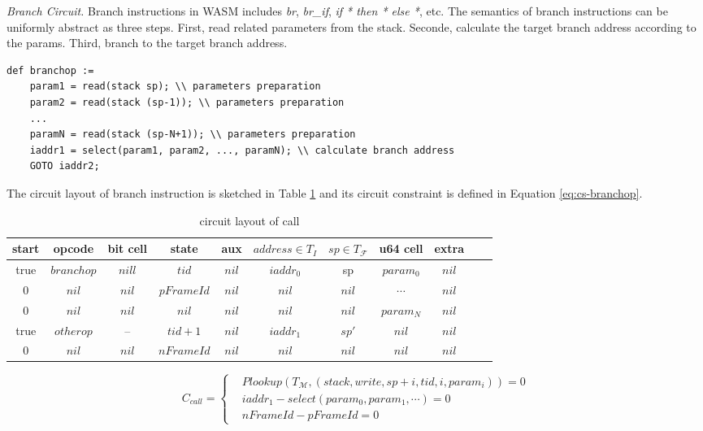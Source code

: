 \smallskip\noindent\emph{Branch Circuit.}
Branch instructions in WASM includes \emph{br}, \emph{br\_if}, \emph{if * then * else *}, etc. The semantics of branch instructions can be uniformly abstract as three steps. First, read related parameters from the stack. Seconde, calculate the target branch address according to the params. Third, branch to the target branch address.
\begin{verbatim}
def branchop :=
    param1 = read(stack sp); \\ parameters preparation
    param2 = read(stack (sp-1)); \\ parameters preparation
    ...
    paramN = read(stack (sp-N+1)); \\ parameters preparation
    iaddr1 = select(param1, param2, ..., paramN); \\ calculate branch address
    GOTO iaddr2;
\end{verbatim}
\smallskip The circuit layout of branch instruction is sketched in Table \ref{tbl:branch-instruction} and its circuit constraint is defined in Equation \ref{eq:cs-branchop}. 
\begin{table}[!h]
\begin{center}
\begin{tabular}{ | c | c | c | c | c | c | c | c | c | c | c | }
  \hline
  start & opcode & bit cell & state & aux & $address \in T_{I}$ & $sp \in T_\mathcal{F}$& u64 cell & extra \\ 
  \hline
   true & $branchop$ & $nill$ & $tid$ & $nil$ & $iaddr_0$ & sp & $param_0$ & $nil$\\ 
 \hline
   0 & $nil$ & $nil$ & $pFrameId$ & $nil$ & $nil$ & $nil$ & $\cdots$ & $nil$\\ 
 \hline
   0 & $nil$ & $nil$ & $nil$ & $nil$ & $nil$ & $nil$ & $param_N$ & $nil$\\ 
 \hline
   true & $otherop$ & -- & $tid + 1$ & $nil$ & $iaddr_1$ & $sp'$ & $nil$ & $nil$\\
 \hline
   0 & $nil$ & $nil$ & $nFrameId$ & $nil$ & $nil$ & $nil$ & $nil$ & $nil$\\ 
 \hline
\end{tabular}
\caption{circuit layout of call}
\label{tbl:branch-instruction}
\end{center}
\end{table}
\begin{equation}
    C_{call} = \begin{cases}
        &Plookup(T_\mathcal{M}, (stack, write, sp+i, tid, i, param_i)) = 0 \\
        &iaddr_1 - select(param_0, param_1, \cdots) = 0 \\
        &nFrameId - pFrameId = 0
    \end{cases}
\label{eq:cs-branchop}
\end{equation}

